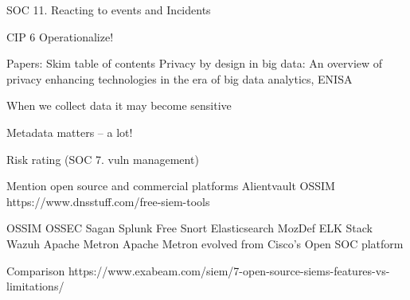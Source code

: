 \documentclass[Screen16to9,17pt]{foils}
\begin{document}

\begin{quote}

\end{quote}

\begin{list1}
\item SOC 11. Reacting to events and Incidents
\begin{list2}
\item
\end{list2}
\end{list1}




\begin{quote}

\end{quote}

\begin{list1}
\item CIP 6 Operationalize!
\begin{list2}
\item
\end{list2}
\end{list1}




\begin{quote}

\end{quote}

\begin{list1}
\item Papers: Skim table of contents Privacy by design in big data: An overview of privacy enhancing technologies in the era of big data analytics, ENISA
\begin{list2}
\item When we collect data it may become sensitive
\item Metadata matters -- a lot!
\end{list2}
\end{list1}





\begin{list1}
\item
\end{list1}

\slidenext{}




Risk rating (SOC 7. vuln management)


Mention open source and commercial platforms
Alientvault OSSIM
https://www.dnsstuff.com/free-siem-tools

OSSIM
OSSEC
Sagan
Splunk Free
Snort
Elasticsearch
MozDef
ELK Stack
Wazuh
Apache Metron  Apache Metron evolved from Cisco’s Open SOC platform

Comparison
https://www.exabeam.com/siem/7-open-source-siems-features-vs-limitations/
\end{document}
